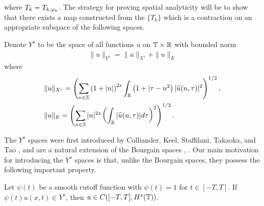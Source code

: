 %
where $T_k = T_{k,\varphi_k}$.
%
The strategy for proving spatial analyticity will be to show that there exists a
map constructed from the $\{T_k\}$ which is a
contraction on an appropriate subspace of the following spaces.
\begin{definition}
	Denote $Y^s$ to be the space of all
	functions $u$ on $\mathbb{T} \times \mathbb{R}$ with
	bounded norm
\begin{equation}
	\label{pY-s-norm}
	\begin{split}
    \|u\|_{Y^s} = \|u\|_{X^s} + \|u\|_E
  \end{split}
\end{equation}
%
%
%
%
where
%
\begin{equation}
	\label{pX^s-norm}
	\begin{split}
		& \|u\|_{X^s}
		= \left ( \sum_{n\in \mathbb{Z}} \left (1 + |n| \right )^{2s} \int_{\mathbb{R}} \left ( 1 + | 
		\tau - n^{2} \right ) | \widehat{u} ( n, \tau ) |^2
		\right )^{1/2},
    \\
    & \|u\|_E = \left( \sum_{n \in \mathbb{Z}} | n |^{2s} \left(
    \int_{\mathbb{R}} | \widehat{u}(n, \tau) |d \tau
    \right)^{2} \right)^{1/2}.
	\end{split}
\end{equation}
%
%
%
\end{definition}
The $Y^s$ spaces were first introduced by Colliander, Keel, Staffilani, Takaoka,
and Tao \cite{Colliander:2003kx}, and are a natural extension of the Bourgain spaces
\cite{Bourgain-Fourier-transfo-1}, \cite{Bourgain-Fourier-transfo}. Our main
motivation for introducing the $Y^s$ spaces is that, unlike the
Bourgain spaces, they possess the
following important property.
%
%
\begin{lemma}[Embedding]
	\label{plem:cutoff-loc-soln}
	Let $\psi(t)$ be a smooth cutoff function with $\psi(t) =1$ for $t \in [-T, T]$. If
	$\psi(t)u(x,t) \in Y^s$, then $u \in C([-T, T], H^s(\mathbb{T}))$.
\end{lemma}
%
%
%
%
%
%
%
%
%
%
